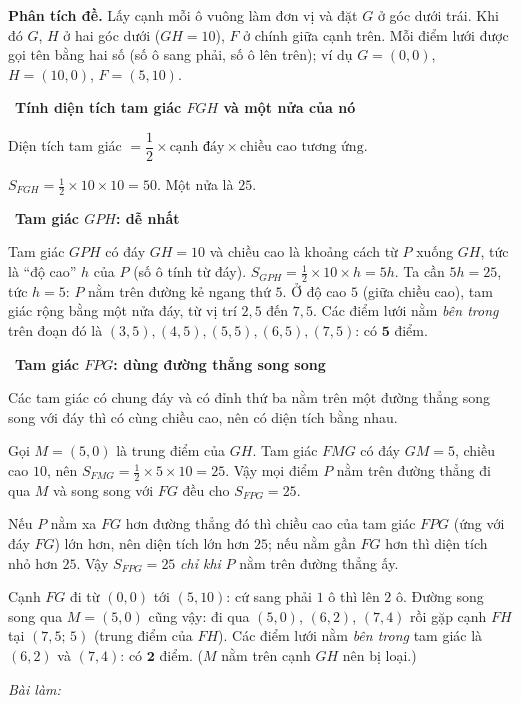 \documentclass[11pt]{article}
\newif\ifsol \solfalse
\newcommand{\probsol}[1]{%
  \begin{lrbox}{\solmeasure}\begin{minipage}{\dimexpr\linewidth-24pt\relax}#1\end{minipage}\end{lrbox}%
  \ifsol
    \begin{solbox}#1\end{solbox}%
  \else
    \setlength{\solht}{\dimexpr\ht\solmeasure+\dp\solmeasure+0.85cm\relax}%
    \ifdim\solht<1.35cm\setlength{\solht}{1.35cm}\fi
    \ifdim\solht>\StudentMaxWork\setlength{\solht}{\StudentMaxWork}\fi
    \begin{tcolorbox}[colback=white,colframe=Line,boxrule=0.8pt,arc=5pt,
      left=8pt,right=8pt,top=4pt,bottom=4pt,height=\solht]{\footnotesize\color{Slate}\itshape\WorkWord}\end{tcolorbox}%
  \fi}
\newlength{\StudentMaxWork}\setlength{\StudentMaxWork}{7.5cm}
\newcommand{\step}[2]{\par\smallskip\noindent{\bfseries\color{tmBlue!85!black}\StepWord~#1.}\ {\bfseries #2}\par\nopagebreak}
\def\WorkWord{Bài làm:}
\def\StepWord{Bước}
\begin{document}
\probsol{
\textbf{Phân tích đề.} Lấy cạnh mỗi ô vuông làm đơn vị và đặt $G$ ở góc dưới trái. Khi đó $G$, $H$ ở hai góc dưới
($GH=10$), $F$ ở chính giữa cạnh trên. Mỗi điểm lưới được gọi tên bằng hai số (số ô sang phải, số ô lên trên); ví dụ
$G=(0,0)$, $H=(10,0)$, $F=(5,10)$.

\step{1}{Tính diện tích tam giác $FGH$ và một nửa của nó}
\begin{recallbox}Diện tích tam giác $=\dfrac12\times\text{cạnh đáy}\times\text{chiều cao tương ứng}$.\end{recallbox}
$S_{FGH}=\frac12\times10\times10=50$. Một nửa là $25$.

\step{2}{Tam giác $GPH$: dễ nhất}
Tam giác $GPH$ có đáy $GH=10$ và chiều cao là khoảng cách từ $P$ xuống $GH$, tức là ``độ cao'' $h$ của $P$
(số ô tính từ đáy). $S_{GPH}=\frac12\times10\times h=5h$. Ta cần $5h=25$, tức $h=5$: $P$ nằm trên đường kẻ ngang
thứ $5$. Ở độ cao $5$ (giữa chiều cao), tam giác rộng bằng một nửa đáy, từ vị trí $2{,}5$ đến $7{,}5$. Các điểm lưới
nằm \emph{bên trong} trên đoạn đó là $(3,5),(4,5),(5,5),(6,5),(7,5)$: có $\mathbf{5}$ điểm.

\step{3}{Tam giác $FPG$: dùng đường thẳng song song}
\begin{recallbox}Các tam giác có chung đáy và có đỉnh thứ ba nằm trên một đường thẳng song song với đáy thì có
cùng chiều cao, nên có diện tích bằng nhau.\end{recallbox}
Gọi $M=(5,0)$ là trung điểm của $GH$. Tam giác $FMG$ có đáy $GM=5$, chiều cao $10$, nên $S_{FMG}=\frac12\times5\times10=25$.
Vậy mọi điểm $P$ nằm trên đường thẳng đi qua $M$ và song song với $FG$ đều cho $S_{FPG}=25$.
\begin{proofbox}Nếu $P$ nằm xa $FG$ hơn đường thẳng đó thì chiều cao của tam giác $FPG$ (ứng với đáy $FG$) lớn hơn, nên
diện tích lớn hơn $25$; nếu nằm gần $FG$ hơn thì diện tích nhỏ hơn $25$. Vậy $S_{FPG}=25$ \emph{chỉ khi} $P$ nằm trên
đường thẳng ấy.\end{proofbox}
Cạnh $FG$ đi từ $(0,0)$ tới $(5,10)$: cứ sang phải $1$ ô thì lên $2$ ô. Đường song song qua $M=(5,0)$ cũng vậy:
đi qua $(5,0)$, $(6,2)$, $(7,4)$ rồi gặp cạnh $FH$ tại $(7{,}5;\,5)$ (trung điểm của $FH$). Các điểm lưới nằm
\emph{bên trong} tam giác là $(6,2)$ và $(7,4)$: có $\mathbf{2}$ điểm. ($M$ nằm trên cạnh $GH$ nên bị loại.)

}
\end{document}

